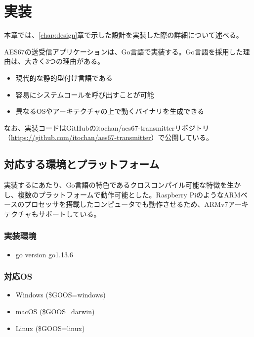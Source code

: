 \chapter{実装}
\label{chap:implementation}

本章では、\ref{chap:design}章で示した設計を実装した際の詳細について述べる。

AES67の送受信アプリケーションは、Go言語で実装する。Go言語を採用した理由は、大きく3つの理由がある。

\begin{itemize}
  \item 現代的な静的型付け言語である
  \item 容易にシステムコールを呼び出すことが可能
  \item 異なるOSやアーキテクチャの上で動くバイナリを生成できる
\end{itemize}

なお、実装コードはGitHubのitochan/aes67-transmitterリポジトリ（\url{https://github.com/itochan/aes67-transmitter}）で公開している。

\section{対応する環境とプラットフォーム}

実装するにあたり、Go言語の特色であるクロスコンパイル可能な特徴を生かし、複数のプラットフォームで動作可能とした。Raspberry PiのようなARMベースのプロセッサを搭載したコンピュータでも動作させるため、ARMv7アーキテクチャもサポートしている。

\subsection{実装環境}

\begin{itemize}
  \item{go version go1.13.6}
\end{itemize}

\subsection{対応OS}

\begin{itemize}
  \item Windows (\$GOOS=windows)
  \item macOS (\$GOOS=darwin)
  \item Linux (\$GOOS=linux)
\end{itemize}

